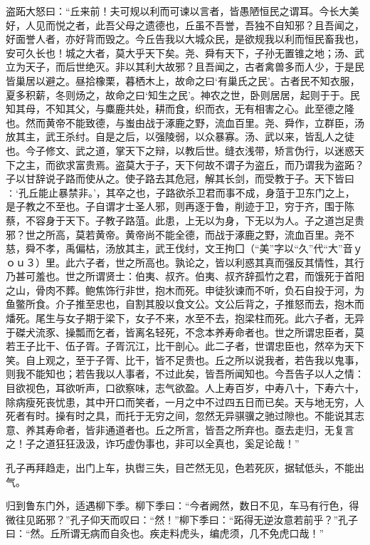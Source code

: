 \documentclass[]{article}
\begin{document}
盗跖大怒曰：``丘来前！夫可规以利而可谏以言者，皆愚陋恒民之谓耳。今长大美好，人见而悦之者，此吾父母之遗德也，丘虽不吾誉，吾独不自知邪？且吾闻之，好面誉人者，亦好背而毁之。今丘告我以大城众民，是欲规我以利而恒民畜我也，安可久长也！城之大者，莫大乎天下矣。尧、舜有天下，子孙无置锥之地；汤、武立为天子，而后世绝灭。非以其利大故邪？且吾闻之，古者禽兽多而人少，于是民皆巢居以避之。昼拾橡栗，暮栖木上，故命之曰`有巢氏之民'。古者民不知衣服，夏多积薪，冬则炀之，故命之曰`知生之民'。神农之世，卧则居居，起则于于。民知其母，不知其父，与麋鹿共处，耕而食，织而衣，无有相害之心。此至德之隆也。然而黄帝不能致德，与蚩由战于涿鹿之野，流血百里。尧、舜作，立群臣，汤放其主，武王杀纣。自是之后，以强陵弱，以众暴寡。汤、武以来，皆乱人之徒也。今子修文、武之道，掌天下之辩，以教后世。缝衣浅带，矫言伪行，以迷惑天下之主，而欲求富贵焉。盗莫大于子，天下何故不谓子为盗丘，而乃谓我为盗跖？子以甘辞说子路而使从之。使子路去其危冠，解其长剑，而受教于子。天下皆曰∶`孔丘能止暴禁非。'，其卒之也，子路欲杀卫君而事不成，身菹于卫东门之上，是子教之不至也。子自谓才士圣人邪，则再逐于鲁，削迹于卫，穷于齐，围于陈蔡，不容身于天下。子教子路菹。此患，上无以为身，下无以为人。子之道岂足贵邪？世之所高，莫若黄帝。黄帝尚不能全德，而战于涿鹿之野，流血百里。尧不慈，舜不孝，禹偏枯，汤放其主，武王伐纣，文王拘囗（``美''字以``久''代``大''音ｙｏｕ３）里。此六子者，世之所高也。孰论之，皆以利惑其真而强反其情性，其行乃甚可羞也。世之所谓贤士：伯夷、叔齐。伯夷、叔齐辞孤竹之君，而饿死于首阳之山，骨肉不葬。鲍焦饰行非世，抱木而死。申徒狄谏而不听，负石自投于河，为鱼鳖所食。介子推至忠也，自割其股以食文公。文公后背之，子推怒而去，抱木而燔死。尾生与女子期于梁下，女子不来，水至不去，抱梁柱而死。此六子者，无异于磔犬流豕、操瓢而乞者，皆离名轻死，不念本养寿命者也。世之所谓忠臣者，莫若王子比干、伍子胥。子胥沉江，比干剖心。此二子者，世谓忠臣也，然卒为天下笑。自上观之，至于子胥、比干，皆不足贵也。丘之所以说我者，若告我以鬼事，则我不能知也；若告我以人事者，不过此矣，皆吾所闻知也。今吾告子以人之情：目欲视色，耳欲听声，口欲察味，志气欲盈。人上寿百岁，中寿八十，下寿六十，除病瘦死丧忧患，其中开口而笑者，一月之中不过四五日而已矣。天与地无穷，人死者有时。操有时之具，而托于无穷之间，忽然无异骐骥之驰过隙也。不能说其志意、养其寿命者，皆非通道者也。丘之所言，皆吾之所弃也。亟去走归，无复言之！子之道狂狂汲汲，诈巧虚伪事也，非可以全真也，奚足论哉！''

孔子再拜趋走，出门上车，执辔三失，目芒然无见，色若死灰，据轼低头，不能出气。

归到鲁东门外，适遇柳下季。柳下季曰：``今者阙然，数日不见，车马有行色，得微往见跖邪？''孔子仰天而叹曰：``然！''柳下季曰：``跖得无逆汝意若前乎？''孔子曰：``然。丘所谓无病而自灸也。疾走料虎头，编虎须，几不免虎口哉！''
\end{document}
